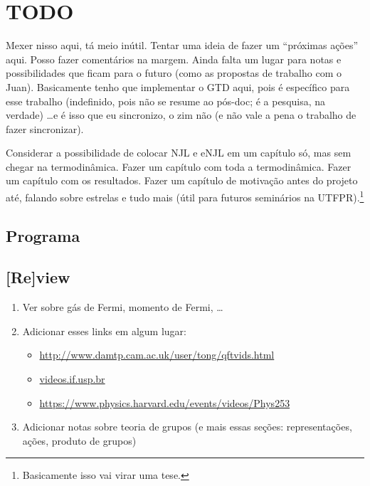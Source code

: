 \chapter{TODO}

Mexer nisso aqui, tá meio inútil. Tentar uma ideia de fazer um ``próximas ações'' aqui. Posso fazer comentários na margem. Ainda falta um lugar para notas e possibilidades que ficam para o futuro (como as propostas de trabalho com o Juan). Basicamente tenho que implementar o GTD aqui, pois é específico para esse trabalho (indefinido, pois não se resume ao pós-doc; é a pesquisa, na verdade) \dots e é isso que eu sincronizo, o zim não (e não vale a pena o trabalho de fazer sincronizar).

Considerar a possibilidade de colocar NJL e eNJL em um capítulo só, mas sem chegar na termodinâmica. Fazer um capítulo com toda a termodinâmica. Fazer um capítulo com os resultados. Fazer um capítulo de motivação antes do projeto até, falando sobre estrelas e tudo mais (útil para futuros seminários na UTFPR).\footnote{Basicamente isso vai virar uma tese.}

\section{Programa}

\begin{enumerate}

\end{enumerate}

\section{[Re]view}

\begin{enumerate}
\item Ver sobre gás de Fermi, momento de Fermi, \dots
\item Adicionar esses links em algum lugar:
	\begin{itemize}
		\item \url{http://www.damtp.cam.ac.uk/user/tong/qftvids.html}
		\item \url{videos.if.usp.br}
		\item \url{https://www.physics.harvard.edu/events/videos/Phys253}
	\end{itemize}
\item Adicionar notas sobre teoria de grupos (e mais essas seções: representações, ações, produto de grupos)
\end{enumerate}

